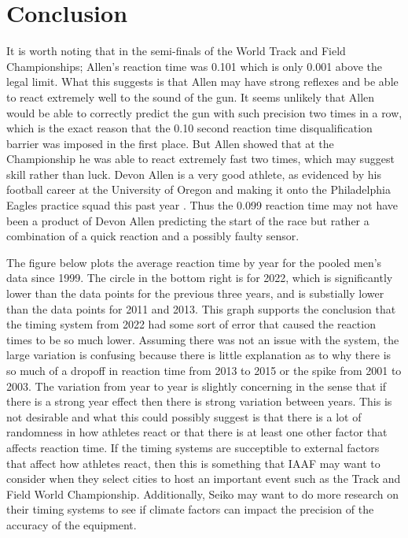 \documentclass[12pt, letterpaper, titlepage]{article}
\begin{document}
\section{Conclusion}
\label{sec:conclusion}
It is worth noting that in the semi-finals of the World Track and
Field Championships; Allen's reaction time was 0.101 which is only 0.001 above
the legal limit.  What this suggests is that Allen may have strong reflexes
and be able to react extremely well to the sound of the gun.  It seems unlikely that
Allen would be able to correctly predict the gun with such precision two times in a row,
which is the exact reason that the 0.10 second reaction time disqualification barrier was
imposed in the first place.  But Allen showed that at the Championship he was able to
react extremely fast two times, which may suggest skill rather than luck. Devon Allen is a very good athlete, as evidenced by his football career at the University of Oregon
and making it onto the Philadelphia Eagles practice squad this past year \citep{Hurley}.
Thus the 0.099 reaction time may not have been a product of Devon Allen
predicting the start of the race but rather a combination of a quick reaction 
and a possibly faulty sensor.

 




The figure below plots the average reaction time by year for the pooled men's data since
1999.  The circle in the bottom right is for 2022, which is significantly lower than the
data points for the previous three years, and is substially lower than the data points
for 2011 and 2013.  This graph supports the conclusion that the timing system from 2022
had some sort of error that caused the reaction times to be so much lower.  Assuming there
was not an issue with the system, the large variation is confusing because there is little explanation
as to why there is so much of a dropoff in reaction time from 2013 to 2015 or the spike
from 2001 to 2003.  The variation from year to year is slightly concerning in the
sense that if there is a strong year effect then there is strong variation between
years.  This is not desirable and what this could possibly suggest is that
there is a lot of randomness in how athletes react or that there is at least one
other factor that affects reaction time. If the timing systems are succeptible to
external factors that affect how athletes react, then this is something that 
IAAF may want to consider when they select cities to host an important event 
such as the Track and Field World Championship. Additionally, Seiko may want to 
do more research on their timing systems to see if climate factors can impact
the precision of the accuracy of the equipment. 
\end{document}
